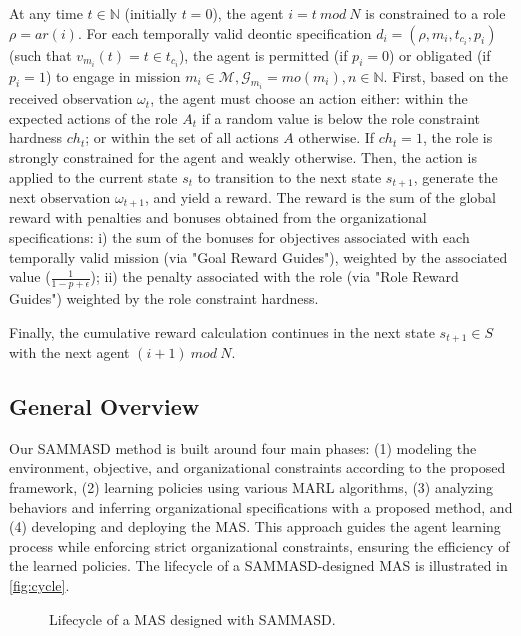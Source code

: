 \documentclass[sigconf,anonymous]{aamas}
\begin{document}
At any time $t \in \mathbb{N}$ (initially $t = 0$), the agent $i = t \ mod \ N$ is constrained to a role $\rho = ar(i)$. For each temporally valid deontic specification $d_i = (\rho,m_i,t_{c_i},p_i)$ (such that $v_{m_i}(t) = t \in t_{c_i}$), the agent is permitted (if $p_i = 0$) or obligated (if $p_i = 1$) to engage in mission $m_i \in \mathcal{M}, \mathcal{G}_{m_i} = mo(m_i), n \in \mathbb{N}$.
%
First, based on the received observation $\omega_t$, the agent must choose an action either: within the expected actions of the role $A_t$ if a random value is below the role constraint hardness $ch_t$; or within the set of all actions $A$ otherwise. If $ch_t = 1$, the role is strongly constrained for the agent and weakly otherwise.
%
Then, the action is applied to the current state $s_t$ to transition to the next state $s_{t+1}$, generate the next observation $\omega_{t+1}$, and yield a reward. The reward is the sum of the global reward with penalties and bonuses obtained from the organizational specifications: \quad i) the sum of the bonuses for objectives associated with each temporally valid mission (via "Goal Reward Guides"), weighted by the associated value ($\frac{1}{1-p+\epsilon}$); \quad ii) the penalty associated with the role (via "Role Reward Guides") weighted by the role constraint hardness.

Finally, the cumulative reward calculation continues in the next state $s_{t+1} \in S$ with the next agent $(i+1) \ mod \ N$.

\subsection{General Overview}

Our SAMMASD method is built around four main phases: (1) modeling the environment, objective, and organizational constraints according to the proposed framework, (2) learning policies using various MARL algorithms, (3) analyzing behaviors and inferring organizational specifications with a proposed method, and (4) developing and deploying the MAS. This approach guides the agent learning process while enforcing strict organizational constraints, ensuring the efficiency of the learned policies. The lifecycle of a SAMMASD-designed MAS is illustrated in \autoref{fig:cycle}.



\begin{figure*}[h!]
  \centering
  
  \caption{Lifecycle of a MAS designed with SAMMASD.}
  \label{fig:cycle}
\end{figure*}
\end{document}

